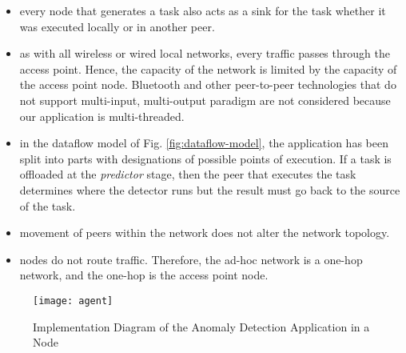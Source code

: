 \begin{itemize}
	\item every node that generates a task
	also acts as a sink for the task whether it was executed 
	locally or in another peer.
	\item as with all wireless or wired local 
	networks, every traffic passes through the access 
	point. Hence, the capacity of the network is limited 
	by the capacity of the access point node. Bluetooth and 
	other peer-to-peer technologies that do not support 
	multi-input, multi-output paradigm are not considered 
	because our application is multi-threaded.
	\item in the dataflow model of Fig. 
	\ref{fig:dataflow-model}, the application has been split 
	into parts with designations of possible points of 
	execution. If a task is offloaded at the 
	\emph{predictor} stage, 
	then the peer that executes the task determines where 
	the 
	detector runs but the result must go back to the 
	source 
	of the task. 
	\item movement of peers within the network does not 
	alter the network topology.
	\item nodes do not route traffic. 
	Therefore, the ad-hoc network is a one-hop network, and 
	the one-hop is the access point node. 
\end{itemize}

\begin{figure}[!t]
	\centering
	\texttt{[image: agent]} 
	\caption{Implementation Diagram of the Anomaly Detection
	Application in a Node}
	\label{fig:agent}
\end{figure}

